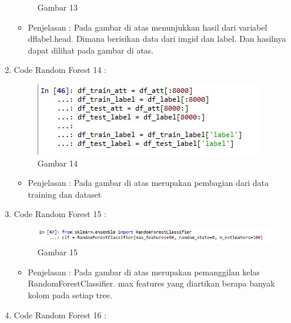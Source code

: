 \begin{enumerate}
\begin{figure}[ht]
\caption{Gambar 13}
\label{contoh}
\end{figure}
\par
\begin{itemize}
\item Penjelasan : Pada gambar di atas menunjukkan hasil dari variabel dflabel.head. Dimana berisikan data dari imgid dan label. Dan hasilnya dapat dilihat pada gambar di atas.
\par
\par
\end{itemize}
\item Code Random Forest 14 :
\par
\begin{figure}[ht]
\centering
\includegraphics[scale=0.7]{figures/AFS/4n.jpg}
\caption{Gambar 14}
\label{contoh}
\end{figure}
\par
\begin{itemize}
\item Penjelasan : Pada gambar di atas merupakan pembagian dari data training dan dataset
\par
\par
\end{itemize}
\item Code Random Forest 15 :
\par
\begin{figure}[ht] 
\centering
\includegraphics[scale=0.7]{figures/AFS/4o.jpg}
\caption{Gambar 15}
\label{contoh}
\end{figure}
\par
\begin{itemize} 
\item Penjelasan : Pada gambar di atas merupakan pemanggilan kelas RandomForestClassifier. max features yang diartikan berapa banyak kolom pada setiap tree.
\par
\par
\end{itemize}
\item Code Random Forest 16 :
\par

\end{enumerate}
